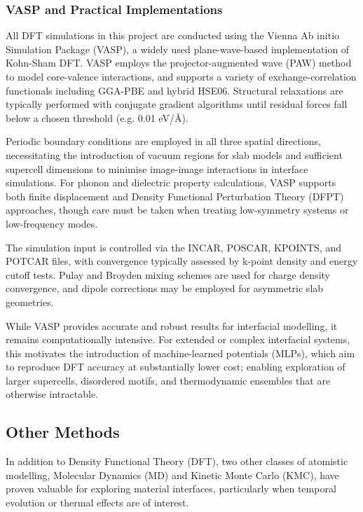 \subsubsection{VASP and Practical Implementations}

All DFT simulations in this project are conducted using the Vienna Ab initio Simulation Package (VASP), a widely used plane-wave-based implementation of Kohn-Sham DFT. VASP employs the projector-augmented wave (PAW) method to model core-valence interactions, and supports a variety of exchange-correlation functionals including GGA-PBE and hybrid HSE06. Structural relaxations are typically performed with conjugate gradient algorithms until residual forces fall below a chosen threshold (e.g. 0.01 eV/\AA).

Periodic boundary conditions are employed in all three spatial directions, necessitating the introduction of vacuum regions for slab models and sufficient supercell dimensions to minimise image-image interactions in interface simulations. For phonon and dielectric property calculations, VASP supports both finite displacement and Density Functional Perturbation Theory (DFPT) approaches, though care must be taken when treating low-symmetry systems or low-frequency modes.

The simulation input is controlled via the INCAR, POSCAR, KPOINTS, and POTCAR files, with convergence typically assessed by k-point density and energy cutoff tests. Pulay and Broyden mixing schemes are used for charge density convergence, and dipole corrections may be employed for asymmetric slab geometries.

While VASP provides accurate and robust results for interfacial modelling, it remains computationally intensive. For extended or complex interfacial systems, this motivates the introduction of machine-learned potentials (MLPs), which aim to reproduce DFT accuracy at substantially lower cost; enabling exploration of larger supercells, disordered motifs, and thermodynamic ensembles that are otherwise intractable.

\subsection{Other Methods}

In addition to Density Functional Theory (DFT), two other classes of atomistic modelling, Molecular Dynamics (MD) and Kinetic Monte Carlo (KMC), have proven valuable for exploring material interfaces, particularly when temporal evolution or thermal effects are of interest.

